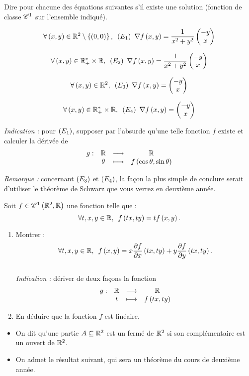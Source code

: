 \begin{exo}[Exercice 6]
Dire pour chacune des équations suivantes s'il existe une solution (fonction de classe \(\mathscr{C}^{1}\) sur l'ensemble indiqué).

\[\quantifs{\forall\paren{x,y}\in\R^2\excluant\accol{\paren{0,0}}}\paren{E_1}~\nabla f\paren{x,y}=\dfrac{1}{x^2+y^2}\dcoords{-y}{x}\]

\[\quantifs{\forall\paren{x,y}\in\Rps\times\R}\paren{E_2}~\nabla f\paren{x,y}=\dfrac{1}{x^2+y^2}\dcoords{-y}{x}\]

\[\quantifs{\forall\paren{x,y}\in\R^2}\paren{E_3}~\nabla f\paren{x,y}=\dcoords{-y}{x}\]

\[\quantifs{\forall\paren{x,y}\in\Rps\times\R}\paren{E_4}~\nabla f\paren{x,y}=\dcoords{-y}{x}\]

\textit{Indication :} pour \(\left(E_1\right)\), supposer par l'absurde qu'une telle fonction \(f\) existe et calculer la dérivée de \[\begin{array}[t]{cccc}g : & \mathbb{R} & \longrightarrow & \mathbb{R} \\ & \theta & \longmapsto & f\left(\cos\theta,\sin\theta\right)\end{array}\]

\textit{Remarque :} concernant \(\left(E_3\right)\) et \(\left(E_4\right)\), la façon la plus simple de conclure serait d'utiliser le théorème de Schwarz que vous verrez en deuxième année.
\end{exo}

\begin{corr}
\end{corr}

\begin{exo}[Exercice 7]
Soit \(f\in\mathscr{C}^{1}\left(\mathbb{R}^2,\mathbb{R}\right)\) une fonction telle que : \[\quantifs{\forall t,x,y\in\R}f\paren{tx,ty}=tf\paren{x,y}.\]

\begin{enumerate}
    \item Montrer : \[\quantifs{\forall t,x,y\in\R}f\paren{x,y}=x\pdv{f}{x}\paren{tx,ty}+y\pdv{f}{y}\paren{tx,ty}.\] \\ \textit{Indication :} dériver de deux façons la fonction \[\begin{array}[t]{cccc}g : & \mathbb{R} & \longrightarrow & \mathbb{R} \\ & t & \longmapsto & f\left(tx,ty\right)\end{array}\]
    \item En déduire que la fonction \(f\) est linéaire.
\end{enumerate}
\end{exo}

\begin{corr}
\end{corr}

\begin{rem}
\begin{itemize}
    \item On dit qu'une partie \(A\subseteq\mathbb{R}^2\) est un fermé de \(\mathbb{R}^2\) si son complémentaire est un ouvert de \(\mathbb{R}^2\). \\
    \item On admet le résultat suivant, qui sera un théorème du cours de deuxième année.
\end{itemize}
\end{rem}

